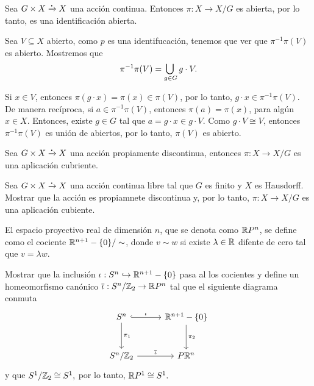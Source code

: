 \begin{prop}
    Sea $G\times X\xrightarrow{\bigdot} X$ una acción continua. Entonces $\pi:X\to X/G$ es abierta, por lo tanto, es una identificación abierta.
\end{prop}
\begin{dem}
    Sea $V\subseteq X$ abierto, como $p$ es una identifucación, tenemos que ver que $\pi^{-1}\pi(V)$ es abierto. Mostremos que
    \begin{equation*}
        \pi^{-1}\pi(V)=\medcup_{g\in G}g\cdot V.
    \end{equation*}
    
    Si $x\in V$, entonces $\pi(g\cdot x)=\pi(x)\in \pi(V)$, por lo tanto, $g\cdot x\in \pi^{-1}\pi(V)$. De manera recíproca, si $a\in\pi^{-1}\pi(V)$, entonces $\pi(a)=\pi(x)$, para algún $x\in X$. Entonces, existe $g\in G$ tal que $a=g\cdot x\in g\cdot V$. Como $g\cdot V\cong V$, entonces $\pi^{-1}\pi(V)$ es unión de abiertos, por lo tanto, $\pi(V)$ es abierto.
\end{dem}
\begin{ejercicio}
    Sea $G\times X\xrightarrow{\bigdot} X$ una acción propiamente discontinua, entonces $\pi:X\to X/G$ es una aplicación cubriente.
\end{ejercicio}
\begin{ejercicio}
    Sea $G\times X\xrightarrow{\bigdot} X$ una acción continua libre tal que $G$ es finito y $X$ es Hausdorff. Mostrar que la acción es propiamnete discontinua y, por lo tanto, $\pi:X\to X/G$ es una aplicación cubiente.
\end{ejercicio}
\begin{definicion}
    El espacio proyectivo real de dimensión $n$, que se denota como $\mathbb{R} P^n$, se define como el cociente $\mathbb{R}^{n+1}-\{0\}/\sim$, donde $v\sim w$ si existe $\lambda\in \mathbb{R}$ difente de cero tal que $v=\lambda w$.
\end{definicion}
\begin{ejercicio}
    Mostrar que la inclusión $\iota:S^n\hookrightarrow \mathbb{R}^{n+1}-\{0\}$ pasa al los cocientes y define un homeomorfismo canónico $\overline{\iota}:S^n/\mathbb{Z}_2\to \mathbb{R} P^n$ tal que el siguiente diagrama conmuta
    \begin{equation*}
        \begin{tikzcd}[column sep=1cm, row sep=1cm]
            S^n\arrow[r,"\iota", hook]\arrow[d,"\pi_1"] & \R^{n+1}-\{0\}\arrow["\pi_2",d]\\
            S^n/\Z_2\arrow["\overline{\iota}",r] & P \R^n
        \end{tikzcd}
    \end{equation*}
    y que $S^1/\mathbb{Z}_2\cong S^1,$ por lo tanto, $\mathbb{R} P^1\cong S^1.$
\end{ejercicio}

